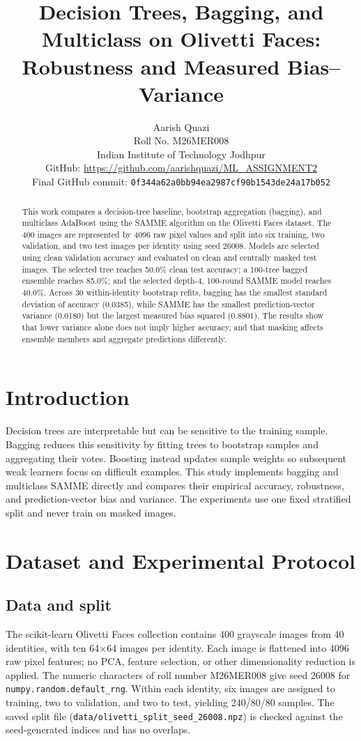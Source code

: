 \documentclass[10pt,twocolumn,letterpaper]{article}
\title{Decision Trees, Bagging, and Multiclass \samme{} on Olivetti Faces: Robustness and Measured Bias--Variance}
\author{Aarish Quazi\\Roll No. M26MER008\\Indian Institute of Technology Jodhpur\\\small GitHub: \url{https://github.com/aarishquazi/ML_ASSIGNMENT2}\\\small Final GitHub commit: \texttt{0f344a62a0bb94ea2987cf90b1543de24a17b052}}
\date{}
\begin{document}
\maketitle
\begin{abstract}
This work compares a decision-tree baseline, bootstrap aggregation (bagging), and multiclass AdaBoost using the SAMME algorithm on the Olivetti Faces dataset. The 400 images are represented by 4096 raw pixel values and split into six training, two validation, and two test images per identity using seed 26008. Models are selected using clean validation accuracy and evaluated on clean and centrally masked test images. The selected tree reaches 50.0\% clean test accuracy; a 100-tree bagged ensemble reaches 85.0\%; and the selected depth-4, 100-round SAMME model reaches 40.0\%. Across 30 within-identity bootstrap refits, bagging has the smallest standard deviation of accuracy (0.0385), while SAMME has the smallest prediction-vector variance (0.0180) but the largest measured bias squared (0.8801). The results show that lower variance alone does not imply higher accuracy, and that masking affects ensemble members and aggregate predictions differently.
\end{abstract}

\section{Introduction}
Decision trees are interpretable but can be sensitive to the training sample. Bagging reduces this sensitivity by fitting trees to bootstrap samples and aggregating their votes. Boosting instead updates sample weights so subsequent weak learners focus on difficult examples. This study implements bagging and multiclass SAMME directly and compares their empirical accuracy, robustness, and prediction-vector bias and variance. The experiments use one fixed stratified split and never train on masked images.

\section{Dataset and Experimental Protocol}
\subsection{Data and split}
The scikit-learn Olivetti Faces collection contains 400 grayscale images from 40 identities, with ten 64$\times$64 images per identity. Each image is flattened into 4096 raw pixel features; no PCA, feature selection, or other dimensionality reduction is applied. The numeric characters of roll number M26MER008 give seed 26008 for \texttt{numpy.random.default\_rng}. Within each identity, six images are assigned to training, two to validation, and two to test, yielding 240/80/80 samples. The saved split file (\texttt{data/olivetti\_split\_seed\_26008.npz}) is checked against the seed-generated indices and has no overlaps.
\end{document}
